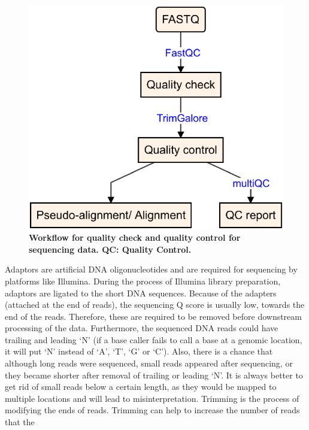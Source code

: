 \documentclass[12pt,twoside]{reedthesis}
\begin{document}
\begin{figure}[htbp]

{\centering \includegraphics{thesis_files/figure-latex/mf3-1} 

}

\caption[Workflow for quality check and quality control for sequencing data]{\textbf{Workflow for quality check and quality control for sequencing data. QC: Quality Control.}}\label{fig:mf3}
\end{figure}
Adaptors are artificial DNA oligonucleotides and are required for
sequencing by platforms like Illumina. During the process of Illumina
library preparation, adaptors are ligated to the short DNA sequences.
Because of the adapters (attached at the end of reads), the sequencing Q
score is usually low, towards the end of the reads. Therefore, these are
required to be removed before downstream processing of the data.
Furthermore, the sequenced DNA reads could have trailing and leading `N'
(if a base caller fails to call a base at a genomic location, it will
put `N' instead of `A', `T', `G' or `C'). Also, there is a chance that
although long reads were sequenced, small reads appeared after
sequencing, or they became shorter after removal of trailing or leading
`N'. It is always better to get rid of small reads below a certain
length, as they would be mapped to multiple locations and will lead to
misinterpretation. Trimming is the process of modifying the ends of
reads. Trimming can help to increase the number of reads that the
\end{document}
